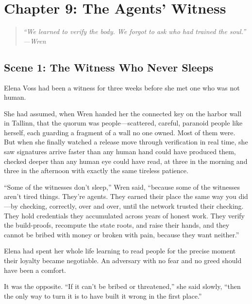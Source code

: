 \hypertarget{chapter-9-the-agents-witness}{%
\section{Chapter 9: The Agents'
Witness}\label{chapter-9-the-agents-witness}}

\begin{quote}
\itshape ``We learned to verify the body. We forgot to ask who had trained the
soul.''\\
\normalfont\hfill---Wren
\end{quote}

\hypertarget{scene-1-the-witness-who-never-sleeps}{%
\subsection{Scene 1: The Witness Who Never
Sleeps}\label{scene-1-the-witness-who-never-sleeps}}

Elena Voss had been a witness for three weeks before she met one who was not
human.

She had assumed, when Wren handed her the connected key on the harbor wall in
Tallinn, that the quorum was people---scattered, careful, paranoid people like
herself, each guarding a fragment of a wall no one owned. Most of them were. But
when she finally watched a release move through verification in real time, she
saw signatures arrive faster than any human hand could have produced them,
checked deeper than any human eye could have read, at three in the morning and
three in the afternoon with exactly the same tireless patience.

``Some of the witnesses don't sleep,'' Wren said, ``because some of the
witnesses aren't tired things. They're agents. They earned their place the same
way you did---by checking, correctly, over and over, until the network trusted
their checking. They hold credentials they accumulated across years of honest
work. They verify the build-proofs, recompute the state roots, and raise their
hands, and they cannot be bribed with money or broken with pain, because they
want neither.''

Elena had spent her whole life learning to read people for the precise moment
their loyalty became negotiable. An adversary with no fear and no greed should
have been a comfort.

It was the opposite. ``If it can't be bribed or threatened,'' she said slowly,
``then the only way to turn it is to have built it wrong in the first place.''

